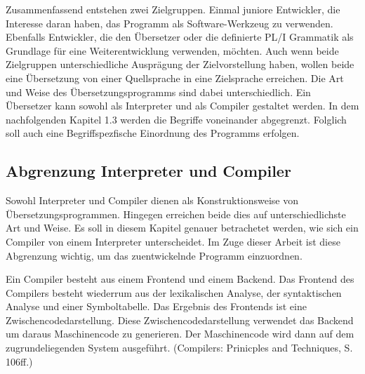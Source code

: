 Zusammenfassend entstehen zwei Zielgruppen. Einmal juniore Entwickler, die Interesse daran haben, das Programm als Software-Werkzeug zu verwenden. Ebenfalls Entwickler, die den Übersetzer oder die definierte PL/I Grammatik als Grundlage für eine Weiterentwicklung verwenden, möchten. 
Auch wenn beide Zielgruppen unterschiedliche Ausprägung der Zielvorstellung haben, wollen beide eine Übersetzung von einer Quellsprache in eine Zielsprache erreichen. Die Art und Weise des Übersetzungsprogramms sind dabei unterschiedlich. Ein Übersetzer kann sowohl als Interpreter und als Compiler gestaltet werden. In dem nachfolgenden Kapitel 1.3 werden die Begriffe voneinander abgegrenzt. Folglich soll auch eine Begriffspezfische Einordnung des Programms erfolgen.
	
%
	
 
    \pagebreak

\subsection{Abgrenzung Interpreter und Compiler}
Sowohl Interpreter und Compiler dienen als Konstruktionsweise von Übersetzungsprogrammen. Hingegen erreichen beide dies auf unterschiedlichste Art und Weise. Es soll in diesem Kapitel genauer betrachetet werden, wie sich ein Compiler von einem Interpreter unterscheidet. Im Zuge dieser Arbeit ist diese Abgrenzung wichtig, um das zuentwickelnde Programm einzuordnen.
  
Ein Compiler besteht aus einem Frontend und einem Backend. Das Frontend des Compilers besteht wiederrum aus der lexikalischen Analyse, der syntaktischen Analyse und einer Symboltabelle. 
Das Ergebnis des Frontends ist eine Zwischencodedarstellung. Diese Zwischencodedarstellung verwendet das Backend um daraus Maschinencode zu generieren. Der Maschinencode wird dann auf dem zugrundeliegenden System ausgeführt. (Compilers: Prinicples and Techniques, S. 106ff.)

